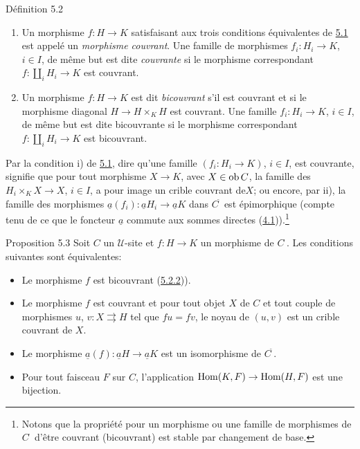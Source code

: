 \documentclass[10pt]{../fichiers-configuration-latex/smfart}
\begin{document}
\begin{enonce*}{Définition 5.2}
\begin{enumerate}
\renewcommand{\labelenumi}{\theenumi)}
\item Un morphisme $f:H\rightarrow K$ satisfaisant aux trois
  conditions équivalentes de \hyperref[II.prop5.1]{5.1} est appelé un \emph{morphisme
  couvrant}. Une famille de morphismes $f_i:H_i\rightarrow K$, $i\in
  I$, de même but est dite \emph{couvrante} si le morphisme correspondant
  $f:\amalg_i H_i\rightarrow K$ est couvrant.

\item Un morphisme $f:H\rightarrow K$ est dit \emph{bicouvrant} s'il est
  couvrant et si le morphisme diagonal $H\rightarrow H\times_K H$ est
  couvrant. Une famille $f_i:H_i\rightarrow K$, $i\in I$, de même
  but est dite bicouvrante si le morphisme correspondant $f:\amalg_i
  H_i\rightarrow K$ est bicouvrant.
\end{enumerate}
\end{enonce*}

Par la condition i) de \hyperref[II.prop5.1]{5.1}, dire qu'une famille
$(f_i:H_i\rightarrow K)$, $i\in I$, est couvrante, signifie que pour
tout morphisme $X\rightarrow K$, avec $X\in \operatorname{ob} C$, la famille des
$H_i\times_K X\rightarrow X$, $i\in I$, a pour image un crible
couvrant de\pageoriginale $X$; ou encore, par ii), la famille des
morphismes $\underline{a}(f_i):\underline{a}H_i\rightarrow \underline{a}K$ dans
$C^{\widetilde{\phantom{,}}}$ est épimorphique (compte tenu de ce
que le foncteur $\underline{a}$ commute aux sommes directes
(\hyperref[II.theo4.1]{4.1})).\footnote[1]{Notons que la propriété pour un
morphisme ou
  une famille de morphismes de $C^{\widehat{\phantom{,}}}$ d'être
  couvrant (\resp bicouvrant) est stable par changement de base.}

\begin{enonce*}{Proposition 5.3}
Soit $C$ un $𝒰$-site et $f:H\rightarrow K$ un morphisme de
$C^{\widehat{\phantom{,}}}$. Les conditions suivantes sont
équivalentes:
\begin{itemize}
\item[i)] Le morphisme $f$ est bicouvrant (\hyperref[II.def5.2]{5.2.2})).

\item[i bis)] Le morphisme $f$ est couvrant et pour tout objet $X$ de
  $C$ et tout couple de morphismes $u$, $v:X\rightrightarrows H$ tel
  que $fu=fv$, le noyau de $(u,v)$ est un crible couvrant de $X$.

\item[ii)] Le morphisme $\underline{a}(f):\underline{a}H\to \underline{a}K$ est un
  isomorphisme
  de $C^{\widetilde{\phantom{,}}}$.

\item[ii bis)] Pour tout faisceau $F$ sur $C$, l'application
  $\operatorname{Hom}(K,F)\rightarrow \operatorname{Hom}(H,F)$ est une bijection.
\end{itemize}
\end{enonce*}
\end{document}
